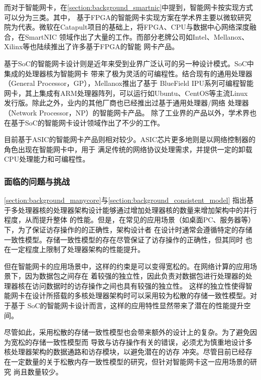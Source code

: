 而对于智能网卡，在\autoref{section:background_smartnic}中提到，智能网卡按实现方式可以分为三类。其中，
基于FPGA的智能网卡实现方案在学术界主要以微软研究院为代表\cite{firestone2018azure,fowers2015scalable,
caulfield2016cloud}。微软在Catapult项目的基础上，将FPGA、CPU与数据中心网络深度融合，在SmartNIC
领域作出了大量的工作。而部分老牌公司如Intel、Mellanox、Xilinx等也陆续推出了许多基于FPGA的智能
网卡产品\cite{intel2020pac,mellanox2020whitepaper,xilinx2020alveou25}。

基于SoC的智能网卡设计则是近年来受到业界广泛认可的另一种设计模式。SoC中集成的处理器核为智能网卡
带来了极为灵活的可编程性。结合现有的通用处理器（General Processor，GP），Mellanox推出了基于
BlueField IPU系列可编程智能网卡，其上集成有ARM处理器阵列，可以运行如Ubuntu、CentOS等主流Linux
发行版\cite{mellanox2020bluefield}。除此之外，业内的其他厂商也已经推出过基于通用处理器/网络
处理器（Network Processor，NP）的智能网卡产品\cite{broadcom2020stingray,annapurna2020announce}。
除了工业界的产品以外，学术界也在基于SoC的智能网卡设计领域作出了不少的工作\cite{di2020pspin}。

目前基于ASIC的智能网卡产品则相对较少。ASIC芯片更多地则是以网络控制器的角色出现在智能网卡中，用于
满足传统的网络协议处理需求，并提供一定的卸载CPU处理能力和可编程性\cite{maxiaoxiao2022survey}。

\subsubsection{面临的问题与挑战}
\label{section:problems_and_challenges}

\autoref{section:background_manycore}与\autoref{section:background_consistent_model}
指出基于多处理器核的处理器架构设计能够通过增加处理器核的数量来增加架构中的并行程度，从而提升整体
的性能。但是，在常见的应用场景（如桌面PC、服务器等）下，为了保证访存操作的的正确性，架构设计者
在设计时通常会遵循特定的存储一致性模型。存储一致性模型的存在尽管保证了访存操作的正确性，但其同时
也在一定程度上限制了处理器架构的性能提升。

但在智能网卡的应用场景中，这样的约束是可以变得宽松的。在网络计算的应用场景下，因为数据包之间存在
着较强的独立性，因此负责对数据包进行处理器的处理器核在访问数据时的访存操作之间也具有较强的独立性。
这样的独立性使得智能网卡在设计所搭载的多核处理器架构时可以采用较为松散的存储一致性模型。对于基于
SoC的智能网卡设计而言，这样的应用特性显然带来了潜在的性能提升空间。

尽管如此，采用松散的存储一致性模型也会带来额外的设计上的复杂。为了避免因为宽松的存储一致性模型而
导致与访存操作有关的错误，必须尤为慎重地设计多核处理器架构的数据通路和访存模块，以避免潜在的访存
冲突。尽管目前已经存在一定数量的关于松散内存一致性模型的研究，但针对智能网卡这一应用场景的研究
尚且数量较少。

